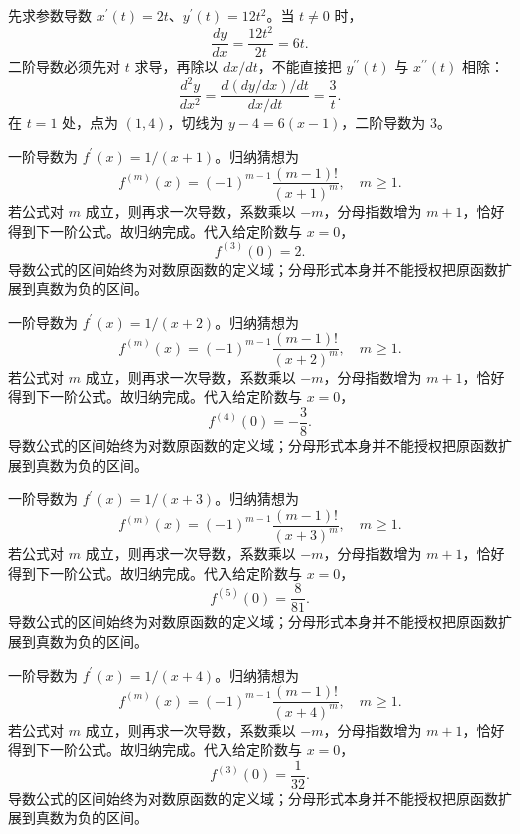 \documentclass[12pt,fontset=fandol]{ctexart}
\begin{document}
\begin{solve}\label{ans:c9q12}
先求参数导数 $x^{\prime}(t)=2t$、$y^{\prime}(t)=12t^2$。当 $t\ne0$ 时，
\[
\frac{dy}{dx}=\frac{12t^2}{2t}=6t.
\]
二阶导数必须先对 $t$ 求导，再除以 $dx/dt$，不能直接把 $y^{\prime\prime}(t)$ 与 $x^{\prime\prime}(t)$ 相除：
\[
\frac{d^2y}{dx^2}=\frac{d(dy/dx)/dt}{dx/dt}=\frac{3}t.
\]
在 $t=1$ 处，点为 $(1,4)$，切线为 $y-4=6(x-1)$，二阶导数为 $3$。
\end{solve}

\begin{solve}\label{ans:c9q13}
一阶导数为 $f^{\prime}(x)=1/(x+1)$。归纳猜想为
\[
f^{(m)}(x)=(-1)^{m-1}\frac{(m-1)!}{(x+1)^m},\quad m\ge1.
\]
若公式对 $m$ 成立，则再求一次导数，系数乘以 $-m$，分母指数增为 $m+1$，恰好得到下一阶公式。故归纳完成。代入给定阶数与 $x=0$，
\[
f^{(3)}(0)=2.
\]
导数公式的区间始终为对数原函数的定义域；分母形式本身并不能授权把原函数扩展到真数为负的区间。
\end{solve}

\begin{solve}\label{ans:c9q14}
一阶导数为 $f^{\prime}(x)=1/(x+2)$。归纳猜想为
\[
f^{(m)}(x)=(-1)^{m-1}\frac{(m-1)!}{(x+2)^m},\quad m\ge1.
\]
若公式对 $m$ 成立，则再求一次导数，系数乘以 $-m$，分母指数增为 $m+1$，恰好得到下一阶公式。故归纳完成。代入给定阶数与 $x=0$，
\[
f^{(4)}(0)=-\frac{3}{8}.
\]
导数公式的区间始终为对数原函数的定义域；分母形式本身并不能授权把原函数扩展到真数为负的区间。
\end{solve}

\begin{solve}\label{ans:c9q15}
一阶导数为 $f^{\prime}(x)=1/(x+3)$。归纳猜想为
\[
f^{(m)}(x)=(-1)^{m-1}\frac{(m-1)!}{(x+3)^m},\quad m\ge1.
\]
若公式对 $m$ 成立，则再求一次导数，系数乘以 $-m$，分母指数增为 $m+1$，恰好得到下一阶公式。故归纳完成。代入给定阶数与 $x=0$，
\[
f^{(5)}(0)=\frac{8}{81}.
\]
导数公式的区间始终为对数原函数的定义域；分母形式本身并不能授权把原函数扩展到真数为负的区间。
\end{solve}

\begin{solve}\label{ans:c9q16}
一阶导数为 $f^{\prime}(x)=1/(x+4)$。归纳猜想为
\[
f^{(m)}(x)=(-1)^{m-1}\frac{(m-1)!}{(x+4)^m},\quad m\ge1.
\]
若公式对 $m$ 成立，则再求一次导数，系数乘以 $-m$，分母指数增为 $m+1$，恰好得到下一阶公式。故归纳完成。代入给定阶数与 $x=0$，
\[
f^{(3)}(0)=\frac{1}{32}.
\]
导数公式的区间始终为对数原函数的定义域；分母形式本身并不能授权把原函数扩展到真数为负的区间。
\end{solve}
\end{document}

